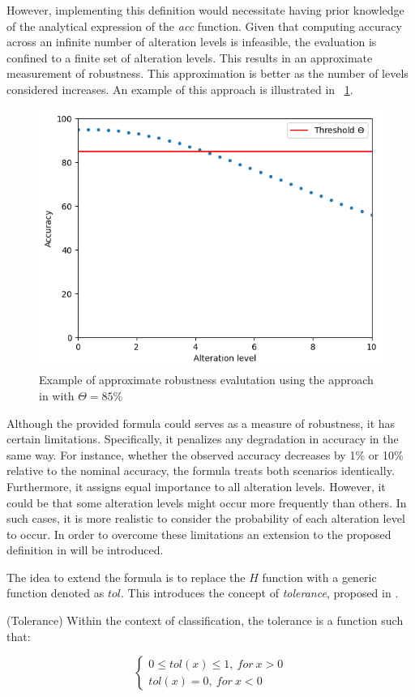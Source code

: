 However, implementing this definition would necessitate having prior knowledge of the analytical expression of the \textit{acc} function. Given that computing accuracy across an infinite number of alteration levels is infeasible, the evaluation is confined to a finite set of alteration levels. This results in an approximate measurement of robustness. This approximation is better as the number of levels considered increases. An example of this approach is illustrated in \Fig~\ref{fig:rob_example_discr}.

\begin{figure}[h]
	\centering
	\includegraphics[width=0.7\linewidth]{ImageFiles/ANNRob/rob_example_discr}
	\caption{Example of approximate robustness evalutation using the approach in \cite{9176802} with $\Theta=85\%$}
	\label{fig:rob_example_discr}
\end{figure}

Although the provided formula could serves as a measure of robustness, it has certain limitations. Specifically, it penalizes any degradation in accuracy in the same way. For instance, whether the observed accuracy decreases by 1\% or 10\% relative to the nominal accuracy, the formula treats both scenarios identically. Furthermore, it assigns equal importance to all alteration levels. However, it could be that some alteration levels might occur more frequently than others. In such cases, it is more realistic to consider the probability of each alteration level to occur. In order to overcome these limitations an extension to the proposed definition in \cite{9176802} will be introduced.

The idea to extend the formula is to replace the $H$ function with a generic function denoted as $tol$. This introduces the concept of \textit{tolerance}, proposed in \cite{9787878}. 

\begin{definition} (Tolerance)
	Within the context of classification, the tolerance is a function such that:
	
	\[
	\begin{cases}
		0 \le tol(x) \le 1 , \ for \ x > 0\\
		tol(x) = 0, \ for \ x < 0
	\end{cases}	
	\]
\end{definition}


